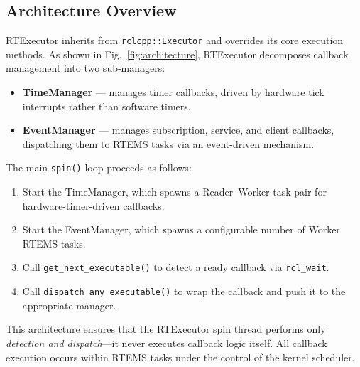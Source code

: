 \subsection{Architecture Overview}

RTExecutor inherits from \texttt{rclcpp::Executor} and overrides its core execution methods.  As shown in Fig.~\ref{fig:architecture}, RTExecutor decomposes callback management into two sub-managers:

\begin{itemize}
    \item \textbf{TimeManager} --- manages timer callbacks, driven by hardware tick interrupts rather than software timers.
    \item \textbf{EventManager} --- manages subscription, service, and client callbacks, dispatching them to RTEMS tasks via an event-driven mechanism.
\end{itemize}

The main \texttt{spin()} loop proceeds as follows:
\begin{enumerate}
    \item Start the TimeManager, which spawns a Reader--Worker task pair for hardware-timer-driven callbacks.
    \item Start the EventManager, which spawns a configurable number of Worker RTEMS tasks.
    \item Call \texttt{get\_next\_executable()} to detect a ready callback via \texttt{rcl\_wait}.
    \item Call \texttt{dispatch\_any\_executable()} to wrap the callback and push it to the appropriate manager.
\end{enumerate}

This architecture ensures that the RTExecutor spin thread performs only \emph{detection and dispatch}---it never executes callback logic itself.  All callback execution occurs within RTEMS tasks under the control of the kernel scheduler.

